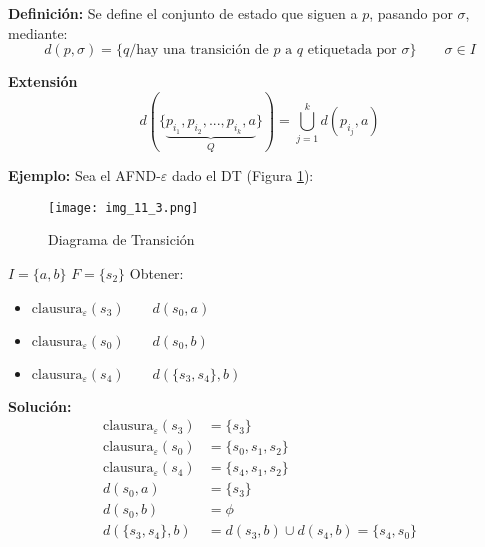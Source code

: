 \textbf{Definición: }Se define el conjunto de estado que siguen a $p$, pasando  por $\sigma$, mediante:
$$d(p,\sigma)=\{q/\mbox{hay una transición de }p\mbox{ a }q\mbox{ etiquetada por  }\sigma\}\qquad \sigma\in I$$

\textbf{Extensión}
$$d(\{\underbrace{p_{i_1},p_{i_2},...,p_{i_k},a}_{Q}\})=\bigcup_{j=1}^{k}d(p_{i_j},a)$$

\textbf{Ejemplo: }Sea el AFND-$\varepsilon$ dado el DT (Figura \ref{img_11_3}):

\begin{figure}[h!]
\centering
\texttt{[image: img\_11\_3.png]}
\caption{Diagrama de Transición} \label{img_11_3}
\end{figure}
$I=\{a,b\}$
$F=\{s_2\}$
Obtener:
\begin{itemize}
\item $\mbox{clausura}_\varepsilon(s_3) \qquad d(s_0,a)$
\item $\mbox{clausura}_\varepsilon(s_0) \qquad d(s_0,b)$
\item $\mbox{clausura}_\varepsilon(s_4) \qquad d(\{s_3,s_4\},b)$
\end{itemize}

\textbf{Solución: }
\begin{align*}
\mbox{clausura}_\varepsilon(s_3)	&=\{s_3\}	\\
\mbox{clausura}_\varepsilon(s_0)	&=\{s_0,s_1,s_2\}	\\
\mbox{clausura}_\varepsilon(s_4)	&=\{s_4,s_1,s_2\}	\\
d(s_0,a)	&=\{s_3\}	\\
d(s_0,b)	&=\phi	\\
d(\{s_3,s_4\},b)	&=d(s_3,b)\cup d(s_4,b)=\{s_4,s_0\}
\end{align*}